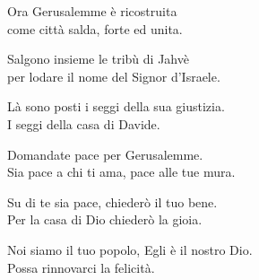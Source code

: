 

\spazio

\strofa Ora Gerusalemme è ricostruita\\
come città salda, forte ed unita.

\spazio


\spazio

\strofa Salgono insieme le tribù di Jahvè\\
per lodare il nome del Signor d'Israele.

\spazio


\spazio

\strofa Là sono posti i seggi della sua giustizia.\\
I seggi della casa di Davide.

\spazio


\spazio

\strofa Domandate pace per Gerusalemme.\\
Sia pace a chi ti ama, pace alle tue mura.

\spazio


\spazio

\strofa Su di te sia pace, chiederò il tuo bene.\\
Per la casa di Dio chiederò la gioia.

\spazio


\spazio

\strofa Noi siamo il tuo popolo, Egli è il nostro Dio.\\
Possa rinnovarci la felicità.

\spazio

